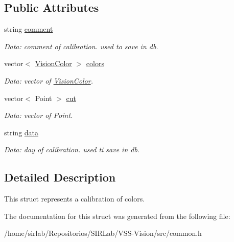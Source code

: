 \subsection*{Public Attributes}
\begin{DoxyCompactItemize}
\item 
\hypertarget{structcommon_1_1Calibration_af7faad7cda5adfffefa44006cdecea85}{string \hyperlink{structcommon_1_1Calibration_af7faad7cda5adfffefa44006cdecea85}{comment}}\label{structcommon_1_1Calibration_af7faad7cda5adfffefa44006cdecea85}

\begin{DoxyCompactList}\small\item\em Data\-: comment of calibration. used to save in db. \end{DoxyCompactList}\item 
\hypertarget{structcommon_1_1Calibration_a219ffe804bda864b9757bc5d32ee49c4}{vector$<$ \hyperlink{structcommon_1_1VisionColor}{Vision\-Color} $>$ \hyperlink{structcommon_1_1Calibration_a219ffe804bda864b9757bc5d32ee49c4}{colors}}\label{structcommon_1_1Calibration_a219ffe804bda864b9757bc5d32ee49c4}

\begin{DoxyCompactList}\small\item\em Data\-: vector of \hyperlink{structcommon_1_1VisionColor}{Vision\-Color}. \end{DoxyCompactList}\item 
\hypertarget{structcommon_1_1Calibration_adb64222af92367a220f889876324edbc}{vector$<$ Point $>$ \hyperlink{structcommon_1_1Calibration_adb64222af92367a220f889876324edbc}{cut}}\label{structcommon_1_1Calibration_adb64222af92367a220f889876324edbc}

\begin{DoxyCompactList}\small\item\em Data\-: vector of Point. \end{DoxyCompactList}\item 
\hypertarget{structcommon_1_1Calibration_abd3a75564db014e04bf2ee76512a3f0b}{string \hyperlink{structcommon_1_1Calibration_abd3a75564db014e04bf2ee76512a3f0b}{data}}\label{structcommon_1_1Calibration_abd3a75564db014e04bf2ee76512a3f0b}

\begin{DoxyCompactList}\small\item\em Data\-: day of calibration. used ti save in db. \end{DoxyCompactList}\end{DoxyCompactItemize}


\subsection{Detailed Description}
This struct represents a calibration of colors. 

The documentation for this struct was generated from the following file\-:\begin{DoxyCompactItemize}
\item 
/home/sirlab/\-Repositorios/\-S\-I\-R\-Lab/\-V\-S\-S-\/\-Vision/src/common.\-h\end{DoxyCompactItemize}

